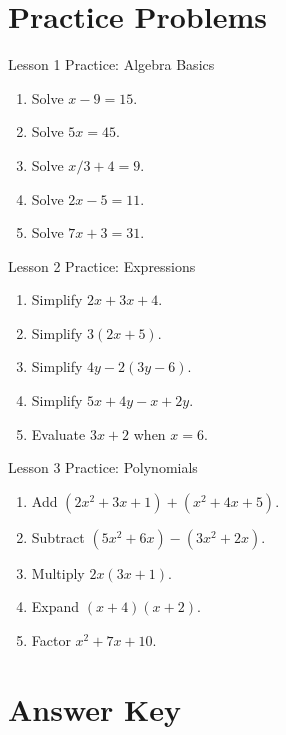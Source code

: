 \documentclass{beamer}
\begin{document}
\section{Practice Problems}

\begin{frame}{Lesson 1 Practice: Algebra Basics}
\begin{enumerate}
    \item Solve $x - 9 = 15$.
    \item Solve $5x = 45$.
    \item Solve $x/3 + 4 = 9$.
    \item Solve $2x - 5 = 11$.
    \item Solve $7x + 3 = 31$.
\end{enumerate}
\end{frame}

\begin{frame}{Lesson 2 Practice: Expressions}
\begin{enumerate}
    \item Simplify $2x + 3x + 4$.
    \item Simplify $3(2x + 5)$.
    \item Simplify $4y - 2(3y - 6)$.
    \item Simplify $5x + 4y - x + 2y$.
    \item Evaluate $3x + 2$ when $x = 6$.
\end{enumerate}
\end{frame}

\begin{frame}{Lesson 3 Practice: Polynomials}
\begin{enumerate}
    \item Add $(2x^2 + 3x + 1) + (x^2 + 4x + 5)$.
    \item Subtract $(5x^2 + 6x) - (3x^2 + 2x)$.
    \item Multiply $2x(3x + 1)$.
    \item Expand $(x + 4)(x + 2)$.
    \item Factor $x^2 + 7x + 10$.
\end{enumerate}
\end{frame}

\section{Answer Key}
\end{document}
